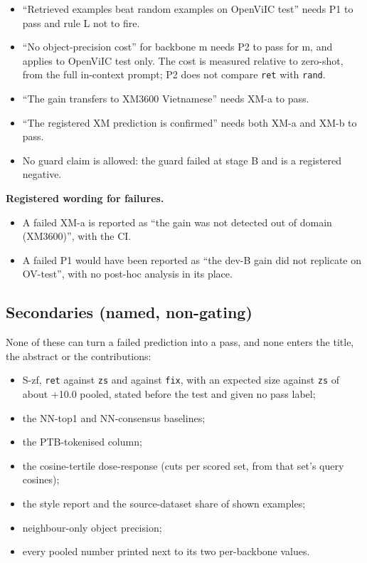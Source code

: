 \documentclass[manuscript,screen]{acmart}
\providecommand{\tightlist}{\setlength{\itemsep}{0pt}\setlength{\parskip}{0pt}}
\begin{document}
\begin{itemize}
\tightlist
\item
  ``Retrieved examples beat random examples on OpenViIC test'' needs P1 to pass and rule L not to
  fire.
\item
  ``No object-precision cost'' for backbone m needs P2 to pass for m, and applies to OpenViIC test
  only. The cost is measured relative to zero-shot, from the full in-context prompt; P2 does not
  compare \texttt{ret} with \texttt{rand}.
\item
  ``The gain transfers to XM3600 Vietnamese'' needs XM-a to pass.
\item
  ``The registered XM prediction is confirmed'' needs both XM-a and XM-b to pass.
\item
  No guard claim is allowed: the guard failed at stage B and is a registered negative.
\end{itemize}

\textbf{Registered wording for failures.}

\begin{itemize}
\tightlist
\item
  A failed XM-a is reported as ``the gain was not detected out of domain (XM3600)'', with the CI.
\item
  A failed P1 would have been reported as ``the dev-B gain did not replicate on OV-test'', with no
  post-hoc analysis in its place.
\end{itemize}

\subsection{Secondaries (named, non-gating)}\label{secondaries-named-non-gating}

None of these can turn a failed prediction into a pass, and none enters the title, the abstract or
the contributions:

\begin{itemize}
\tightlist
\item
  S-zf, \texttt{ret} against \texttt{zs} and against \texttt{fix}, with an expected size against
  \texttt{zs} of about +10.0 pooled, stated before the test and given no pass label;
\item
  the NN-top1 and NN-consensus baselines;
\item
  the PTB-tokenised column;
\item
  the cosine-tertile dose-response (cuts per scored set, from that set's query cosines);
\item
  the style report and the source-dataset share of shown examples;
\item
  neighbour-only object precision;
\item
  every pooled number printed next to its two per-backbone values.
\end{itemize}
\end{document}
